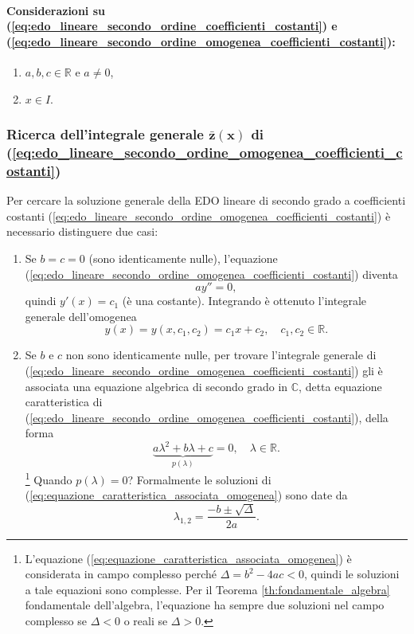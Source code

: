 \paragraph{Considerazioni su (\ref{eq:edo_lineare_secondo_ordine_coefficienti_costanti}) e (\ref{eq:edo_lineare_secondo_ordine_omogenea_coefficienti_costanti}):}
\begin{enumerate}
	\item $a,b,c \in\mathbb{R}$ e $a\neq 0$,
	\item $x\in I$.
\end{enumerate}

\subsubsection{Ricerca dell'integrale generale \texorpdfstring{$\boldsymbol{\bar z(x)}$}{z(x)} di (\ref{eq:edo_lineare_secondo_ordine_omogenea_coefficienti_costanti})}
Per cercare la soluzione generale della EDO lineare di secondo grado a coefficienti costanti (\ref{eq:edo_lineare_secondo_ordine_omogenea_coefficienti_costanti}) è necessario distinguere due casi:
\begin{enumerate}
	\item Se $b=c=0$ (sono identicamente nulle), l'equazione (\ref{eq:edo_lineare_secondo_ordine_omogenea_coefficienti_costanti}) diventa
	\begin{equation*}
		a y''=0,
	\end{equation*}
	quindi $y'(x)=c_1$ (è una costante). Integrando è ottenuto l'integrale generale dell'omogenea
	\begin{equation*}
		y(x)=y(x,c_1,c_2) 
		= c_1 x+c_2,\quad c_1,c_2\in\mathbb{R}.
	\end{equation*}
	\item Se $b$ e $c$ non sono identicamente nulle, per trovare l'integrale generale di (\ref{eq:edo_lineare_secondo_ordine_omogenea_coefficienti_costanti}) gli è associata una equazione algebrica di secondo grado in $\mathbb{C}$, detta equazione caratteristica di (\ref{eq:edo_lineare_secondo_ordine_omogenea_coefficienti_costanti}), della forma
	\begin{equation}\label{eq:equazione_caratteristica_associata_omogenea}
		\underbrace{a\lambda^2 + b\lambda + c}_{p(\lambda)} = 0,\quad\lambda\in\mathbb{R}.
	\end{equation}
	\footnote{L'equazione (\ref{eq:equazione_caratteristica_associata_omogenea}) è considerata in campo complesso perché $\Delta = b^2-4ac<0$, quindi le soluzioni a tale equazioni sono complesse. Per il Teorema \ref{th:fondamentale_algebra} fondamentale dell'algebra, l'equazione ha sempre due soluzioni nel campo complesso se $\Delta<0$ o reali se $\Delta>0$.} Quando $p(\lambda)=0$? Formalmente le soluzioni di (\ref{eq:equazione_caratteristica_associata_omogenea}) sono date da
	\begin{equation*}
		\lambda_{1,2} = \frac{-b\pm\sqrt{\Delta}}{2a}.
	\end{equation*}
\end{enumerate}

